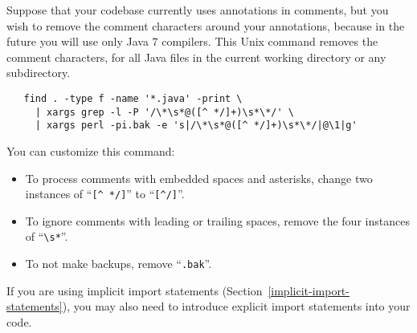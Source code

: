 Suppose that your codebase currently uses annotations in comments, but you
wish to remove the comment characters around your annotations, because in
the future you will use only Java 7 compilers.  This Unix command removes
the comment characters, for all Java files in the current
working directory or any subdirectory.

\begin{Verbatim}
   find . -type f -name '*.java' -print \
     | xargs grep -l -P '/\*\s*@([^ */]+)\s*\*/' \
     | xargs perl -pi.bak -e 's|/\*\s*@([^ */]+)\s*\*/|@\1|g'
\end{Verbatim}

You can customize this command:
\begin{itemize}
\item
To process comments with embedded spaces and asterisks, change
two instances of ``\verb|[^ */]|'' to ``\verb|[^/]|''.
\item
To ignore comments with leading or trailing spaces, remove the four
instances of ``\verb|\s*|''.
\item
  To not make backups, remove
``\verb|.bak|''.
\end{itemize}


If you are using implicit import statements
(Section~\ref{implicit-import-statements}), you may also need to introduce
explicit import statements into your code.



